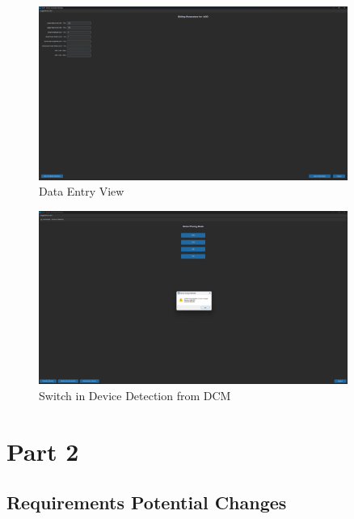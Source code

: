 \documentclass{article}
\begin{document}
\begin{tcolorbox}
    \begin{figure}[H]
        \centering
        \includegraphics[width=0.9\textwidth]{genparams.png}
        \caption{Data Entry View}
    \end{figure}
\end{tcolorbox}

\begin{tcolorbox}
    \begin{figure}[H]
        \centering
        \includegraphics[width=0.9\textwidth]{switchindevice.png}
        \caption{Switch in Device Detection from DCM}
    \end{figure}
\end{tcolorbox}

\newpage
\section{Part 2}

\subsection{Requirements Potential Changes}
\end{document}
